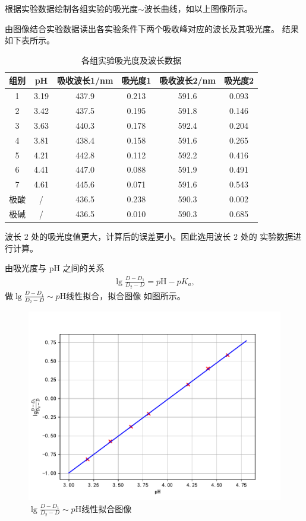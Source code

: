 \documentclass[12pt]{ctexart}
\numberwithin{equation}{section}
\begin{document}
\pagebreak



根据实验数据绘制各组实验的吸光度$\sim$波长曲线，如以上图像所示。

由图像结合实验数据读出各实验条件下两个吸收峰对应的波长及其吸光度。
结果如下表所示。

\begin{longtable}{cccccc}
    \caption{各组实验吸光度及波长数据} \\
    \hline
    组别 & pH & 吸收波长1/nm & 吸光度1 & 吸收波长2/nm & 吸光度2 \\
    \hline
    1 & 3.19 & 437.9 & 0.213 & 591.6 & 0.093 \\
    2 & 3.42 & 437.5 & 0.195 & 591.8 & 0.146 \\
    3 & 3.63 & 440.3 & 0.178 & 592.4 & 0.204 \\
    4 & 3.81 & 438.4 & 0.158 & 591.6 & 0.265 \\
    5 & 4.21 & 442.8 & 0.112 & 592.2 & 0.416 \\
    6 & 4.41 & 447.0 & 0.088 & 591.9 & 0.491 \\
    7 & 4.61 & 445.6 & 0.071 & 591.6 & 0.543 \\
    极酸 & / & 436.5 & 0.238 & 590.3 & 0.002 \\
    极碱 & / & 436.5 & 0.010 & 590.3 & 0.685 \\
    \hline
\end{longtable}

波长 2 处的吸光度值更大，计算后的误差更小。因此选用波长 2 处的
实验数据进行计算。

由吸光度与 pH 之间的关系
\begin{align}
    \lg\frac{D-D_1}{D_2-D} = p\mathrm{H} - pK_a, \tag{I.1}
\end{align}
\newpage
做$\lg\frac{D-D_1}{D_2-D} \sim p\mathrm{H}$线性拟合，拟合图像
如图所示。

\begin{figure}[!h]
    \centering
    \includegraphics[scale=0.68]{fitting.pdf}
    \caption{$\lg\frac{D-D_1}{D_2-D} \sim p\mathrm{H}$线性拟合图像}
\end{figure}
\end{document}
